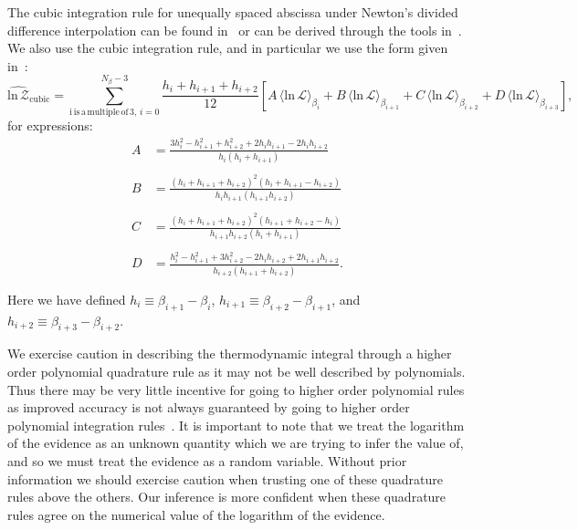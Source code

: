 The cubic integration rule for unequally spaced abscissa under Newton's divided difference interpolation can be found in~\cite{brun1953generalization,selmer1958numerical,chambers1989estimating} or can be derived through the tools in~\cite{abramowitz1965handbook}. We also use the cubic integration rule, and in particular we use the form given in~\cite{chambers1989estimating}:
\begin{equation}
    \widehat{\mathrm{ln} \, \mathcal{Z}}_{\mathrm{cubic}} = \sum_{\mathrm{i\, is\, a \, multiple \, of \, 3}, \, i=0}^{N_\beta-3} \frac{h_i + h_{i+1} + h_{i+2}}{12} \left [A \, \langle \mathrm{ln} \, \mathcal{L} \rangle_{\beta_{i}} + B \, \langle \mathrm{ln} \, \mathcal{L} \rangle_{\beta_{i+1}} + C \, \langle \mathrm{ln} \, \mathcal{L} \rangle_{\beta_{i+2}} + D \, \langle \mathrm{ln} \, \mathcal{L} \rangle_{\beta_{i+3}}\right ],
\end{equation}
for expressions:
\begin{equation}
\begin{array}{llll}
     A &= \frac{3h_i^2 -h_{i+1}^2 +h_{i+2}^2 +2 h_i h_{i+1} - 2h_i h_{i+2}}{h_i (h_i + h_{i+1})} \\ \\
     B &= \frac{(h_i + h_{i+1} + h_{i+2})^2 (h_i + h_{i+1} - h_{i+2})}{h_{i} h_{i+1} (h_{i+1} h_{i+2})} \\ \\
     C &= \frac{(h_i + h_{i+1} + h_{i+2})^2 (h_{i+1} + h_{i+2} - h_i)}{h_{i+1} h_{i+2} (h_i + h_{i+1})} \\ \\
     D &= \frac{h_i^2 - h_{i+1}^2 +3 h_{i+2}^2 - 2h_i h_{i+2} + 2 h_{i+1} h_{i+2}}{h_{i+2}(h_{i+1} + h_{i+2})}.\\ \\
\end{array}
\end{equation}
Here we have defined $h_i \equiv \beta_{i+1} - \beta_{i}$, $h_{i+1} \equiv \beta_{i+2} - \beta_{i+1}$, and $h_{i+2} \equiv \beta_{i+3} - \beta_{i+2}$.

We exercise caution in describing the thermodynamic integral through a higher order polynomial quadrature rule as it may not be well described by polynomials. Thus there may be very little incentive for going to higher order polynomial rules as improved accuracy is not always guaranteed by going to higher order polynomial integration rules~\citep{epperson1987runge}. It is important to note that we treat the logarithm of the evidence as an unknown quantity which we are trying to infer the value of, and so we must treat the evidence as a random variable. Without prior information we should exercise caution when trusting one of these quadrature rules above the others. Our inference is more confident when these quadrature rules agree on the numerical value of the logarithm of the evidence.

